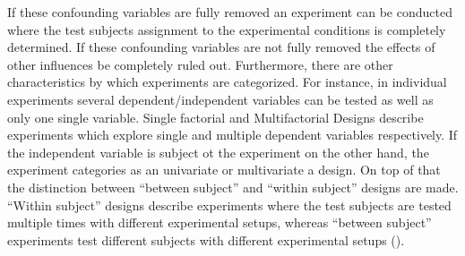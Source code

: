     If these confounding variables are fully removed an experiment can be conducted where the test subjects assignment to the experimental conditions is completely determined. If these confounding variables are not fully removed the effects of other influences be completely ruled out. Furthermore, there are other characteristics by which experiments are categorized. For instance, in individual experiments several dependent/independent variables can be tested as well as only one single variable. Single factorial and Multifactorial Designs describe experiments which explore single and multiple dependent variables respectively. If the independent variable is subject ot the experiment on the other hand, the experiment categories as an univariate or multivariate a design. On top of that the distinction between \enquote{between subject} and \enquote{within subject} designs are made. \enquote{Within subject} designs describe experiments where the test subjects are tested multiple times with different experimental setups, whereas \enquote{between subject} experiments test different subjects with different experimental setups (\cite{Gniewosz.2011}). 





